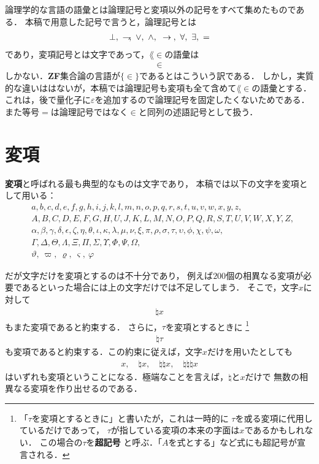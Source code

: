 	論理学的な言語の語彙とは論理記号と変項以外の記号をすべて集めたものである．
	本稿で用意した記号で言うと，論理記号とは
	\begin{align}
		\bot,\ \negation,\ \vee,\ \wedge,\ \rarrow,\ \forall,\ \exists,\ =
	\end{align}
	であり，変項記号とは文字であって，$\lang{\in}$の語彙は
	\begin{align}
		\in
	\end{align}
	しかない．{\bf ZF}集合論の言語が$\{\in\}$であるとはこういう訳である．
	しかし，実質的な違いははないが，本稿では論理記号も変項も全て含めて$\lang{\in}$の語彙とする．
	これは，後で量化子に$\varepsilon$を追加するので論理記号を固定したくないためである．
	また等号$=$は論理記号ではなく$\in$と同列の述語記号として扱う．
	
\section{変項}
\label{sec:variables}
	{\bf 変項}と呼ばれる最も典型的なものは文字であり，
	本稿では以下の文字を変項として用いる：
	\begin{align}
		&a,b,c,d,e,f,g,h,i,j,k,l,m,n,o,p,q,r,s,t,u,v,w,x,y,z, \\
		&A,B,C,D,E,F,G,H,U,J,K,L,M,N,O,P,Q,R,S,T,U,V,W,X,Y,Z, \\
		&\alpha,\beta,\gamma,\delta,\epsilon,\zeta,\eta,\theta,\iota,
			\kappa,\lambda,\mu,\nu,\xi,\pi,\rho,\sigma,\tau,\upsilon,
			\phi,\chi,\psi,\omega, \\
		&\Gamma,\Delta,\Theta,\Lambda,\Xi,\Pi,\Sigma,\Upsilon,\Phi,\Psi,\Omega, \\
		&\vartheta,\ \varpi,\ \varrho,\ \varsigma,\ \varphi
	\end{align}
	
	だが文字だけを変項とするのは不十分であり，
	例えば$200$個の相異なる変項が必要であるといった場合には上の文字だけでは不足してしまう．
	そこで，文字$x$に対して
	\begin{align}
		\natural x
	\end{align}
	もまた変項であると約束する．
	さらに，$\tau$を変項とするときに
	\footnote{
		「$\tau$を変項とするときに」と書いたが，これは一時的に
		$\tau$を或る変項に代用しているだけであって，
		$\tau$が指している変項の本来の字面は$x$であるかもしれない．
		この場合の$\tau$を{\bf 超記号}
		と呼ぶ．「$A$を式とする」など式にも超記号が宣言される．
	}
	\begin{align}
		\natural \tau
	\end{align}
	も変項であると約束する．この約束に従えば，文字$x$だけを用いたとしても
	\begin{align}
		x,\quad \natural x, \quad \natural \natural x, \quad \natural \natural \natural x
	\end{align}
	はいずれも変項ということになる．極端なことを言えば，$\natural$と$x$だけで
	無数の相異なる変項を作り出せるのである．
	

